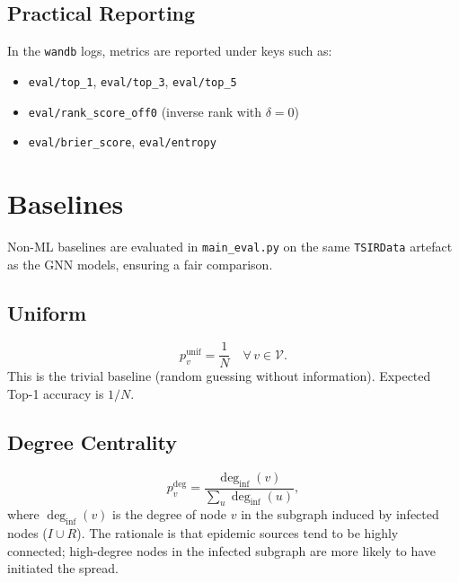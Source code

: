 \documentclass[12pt,a4paper]{report}
\newcommand{\calV}{\mathcal{V}}
\begin{document}
\section{Practical Reporting}

In the \texttt{wandb} logs, metrics are reported under keys such as:
\begin{itemize}[noitemsep]
  \item \texttt{eval/top\_1}, \texttt{eval/top\_3}, \texttt{eval/top\_5}
  \item \texttt{eval/rank\_score\_off0} (inverse rank with $\delta=0$)
  \item \texttt{eval/brier\_score}, \texttt{eval/entropy}
\end{itemize}

\chapter{Baselines}
\label{chap:baselines}

Non-ML baselines are evaluated in \texttt{main\_eval.py} on the same
\texttt{TSIRData} artefact as the GNN models, ensuring a fair comparison.

\section{Uniform}

\begin{equation}
  p_v^{\text{unif}} = \frac{1}{N} \quad \forall\, v \in \calV.
\end{equation}
This is the trivial baseline (random guessing without information). Expected
Top-1 accuracy is $1/N$.

\section{Degree Centrality}

\begin{equation}
  p_v^{\text{deg}} = \frac{\deg_{\text{inf}}(v)}{\sum_u \deg_{\text{inf}}(u)},
\end{equation}
where $\deg_{\text{inf}}(v)$ is the degree of node $v$ in the subgraph induced
by infected nodes ($I \cup R$). The rationale is that epidemic sources tend to
be highly connected; high-degree nodes in the infected subgraph are more likely
to have initiated the spread.
\end{document}

